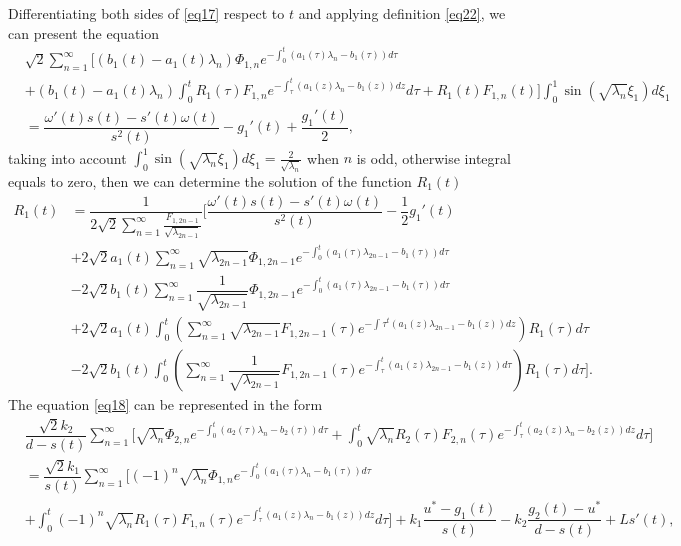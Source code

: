 \documentclass[preprint,12pt,authoryear]{elsarticle}
\begin{document}
Differentiating both sides of \eqref{eq17} respect to $t$ and applying definition \eqref{eq22}, we can present the equation
\begin{equation}\label{eq23}
    \begin{split}
        &\sqrt{2}\sum\limits_{n=1}^{\infty}\Bigg[(b_1(t)-a_1(t)\lambda_{n})\Phi_{1,n}e^{-\int_0^t(a_1(\tau)\lambda_{n}-b_1(\tau))d\tau}\\
        &+(b_1(t)-a_1(t)\lambda_{n})\int_0^tR_1(\tau)F_{1,n}e^{-\int_{\tau}^t(a_1(z)\lambda_{n}-b_1(z))dz}d\tau+R_1(t)F_{1,n}(t)\Bigg]\int_0^1\sin\left(\sqrt{\lambda_{n}}\xi_1\right)d\xi_1\\
        &=\dfrac{\omega'(t)s(t)-s'(t)\omega(t)}{s^2(t)}-g_1'(t)+\dfrac{g_1'(t)}{2},
    \end{split}
\end{equation}
taking into account
$\int_0^1\sin\left(\sqrt{\lambda_{n}}\xi_1\right)d\xi_1=\frac{2}{\sqrt{\lambda_{n}}}$ when $n$ is odd, otherwise integral equals to zero, then we can determine the solution of the function $R_1(t)$
\begin{equation}\label{eq24}
    \begin{split}
       R_1(t)&=\dfrac{1}{2\sqrt{2}\sum\limits_{n=1}^{\infty}\frac{F_{1,2n-1}}{\sqrt{\lambda_{2n-1}}}}\Bigg[\dfrac{\omega'(t)s(t)-s'(t)\omega(t)}{s^2(t)}-\dfrac{1}{2}g_1'(t)\\
       &+2\sqrt{2}a_1(t)\sum\limits_{n=1}^{\infty}\sqrt{\lambda_{2n-1}}\Phi_{1,2n-1}e^{-\int_0^t(a_1(\tau)\lambda_{2n-1}-b_1(\tau))d\tau}\\
       &-2\sqrt{2}b_1(t)\sum\limits_{n=1}^{\infty}\dfrac{1}{\sqrt{\lambda_{2n-1}}}\Phi_{1,2n-1}e^{-\int_0^t(a_1(\tau)\lambda_{2n-1}-b_1(\tau))d\tau}\\
       &+2\sqrt{2}a_1(t)\int_0^t\left(\sum\limits_{n=1}^{\infty}\sqrt{\lambda_{2n-1}}F_{1,2n-1}(\tau)e^{-\int_{}\tau^t(a_1(z)\lambda_{2n-1}-b_1(z))dz}\right)R_1(\tau)d\tau\\
       &-2\sqrt{2}b_1(t)\int_0^t\left(\sum\limits_{n=1}^{\infty}\dfrac{1}{\sqrt{\lambda_{2n-1}}}F_{1,2n-1}(\tau)e^{-\int_{\tau}^t(a_1(z)\lambda_{2n-1}-b_1(z))d\tau}\right)R_1(\tau)d\tau\Bigg].
    \end{split}
\end{equation}
The equation \eqref{eq18} can be represented in the form
\begin{equation}
    \begin{split}
        &\dfrac{\sqrt{2}k_2}{d-s(t)}\sum\limits_{n=1}^{\infty}\Bigg[\sqrt{\lambda_{n}}\Phi_{2,n}e^{-\int_0^t(a_2(\tau)\lambda_{n}-b_2(\tau))d\tau}+\int_0^t\sqrt{\lambda_{n}}R_2(\tau)F_{2,n}(\tau)e^{-\int_{\tau}^t(a_2(z)\lambda_{n}-b_2(z))dz}d\tau\Bigg]\\
        &=\dfrac{\sqrt{2}k_1}{s(t)}\sum\limits_{n=1}^{\infty}\Bigg[(-1)^n\sqrt{\lambda_{n}}\Phi_{1,n}e^{-\int_0^t(a_1(\tau)\lambda_{n}-b_1(\tau))d\tau}\\
        &+\int_0^t(-1)^n\sqrt{\lambda_{n}}R_1(\tau)F_{1,n}(\tau)e^{-\int_{\tau}^t(a_1(z)\lambda_{n}-b_1(z))dz}d\tau\Bigg]+k_1\dfrac{u^*-g_1(t)}{s(t)}-k_2\dfrac{g_2(t)-u^*}{d-s(t)}+Ls'(t),
    \end{split}  
\end{equation}
\end{document}
